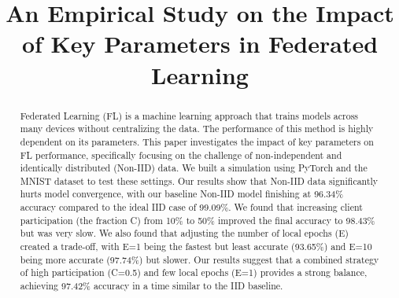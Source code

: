 \documentclass[conference]{IEEEtran}
\begin{document}
\title{An Empirical Study on the Impact of Key Parameters in Federated Learning
}

\author{
\and
\and
}

\maketitle

\begin{abstract}
Federated Learning (FL) is a machine learning approach that trains models across many devices without centralizing the data. The performance of this method is highly dependent on its parameters. This paper investigates the impact of key parameters on FL performance, specifically focusing on the challenge of non-independent and identically distributed (Non-IID) data. We built a simulation using PyTorch and the MNIST dataset to test these settings. Our results show that Non-IID data significantly hurts model convergence, with our baseline Non-IID model finishing at 96.34\% accuracy compared to the ideal IID case of 99.09\%. We found that increasing client participation (the fraction C) from 10\% to 50\% improved the final accuracy to 98.43\% but was very slow. We also found that adjusting the number of local epochs (E) created a trade-off, with E=1 being the fastest but least accurate (93.65\%) and E=10 being more accurate (97.74\%) but slower. Our results suggest that a combined strategy of high participation (C=0.5) and few local epochs (E=1) provides a strong balance, achieving 97.42\% accuracy in a time similar to the IID baseline.
\end{abstract}
\end{document}
